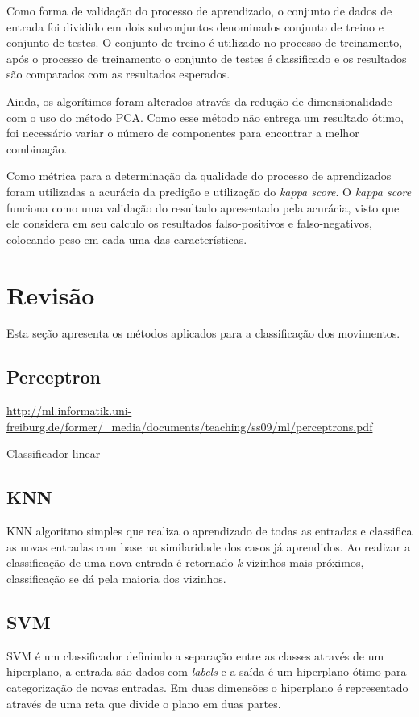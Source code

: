 \documentclass[12pt]{article}
\begin{document}
	Como forma de validação do processo de aprendizado, o conjunto de dados de entrada foi dividido em dois subconjuntos denominados conjunto de treino e conjunto de testes. O conjunto de treino é utilizado no processo de treinamento, após o processo de treinamento o conjunto de testes é classificado e os resultados são comparados com as resultados esperados.
	
	Ainda, os algorítimos foram alterados através da redução de dimensionalidade com o uso do método PCA. Como esse método não entrega um resultado ótimo, foi necessário variar o número de componentes para encontrar a melhor combinação.

	Como métrica para a determinação da qualidade do processo de aprendizados foram utilizadas a acurácia da predição e utilização do \emph{kappa score}. O \textit{kappa score} funciona como uma validação do resultado apresentado pela acurácia, visto que ele considera em seu calculo os resultados falso-positivos e falso-negativos, colocando peso em cada uma das características. 

\section{Revisão}

	Esta seção apresenta os métodos aplicados para a classificação dos movimentos.

\subsection{Perceptron}

	\url{http://ml.informatik.uni-freiburg.de/former/_media/documents/teaching/ss09/ml/perceptrons.pdf}

	Classificador linear 
\subsection{KNN}

	KNN algoritmo simples que realiza o aprendizado de todas as entradas e classifica as novas entradas com base na similaridade dos casos já aprendidos. Ao realizar a classificação de uma nova entrada é retornado \emph{k} vizinhos mais próximos, classificação se dá pela maioria dos vizinhos.
	

\subsection{SVM}

	SVM é um classificador definindo a separação entre as classes através de um hiperplano, a entrada são dados com \emph{labels} e a saída é um hiperplano ótimo para categorização de novas entradas. Em duas dimensões o hiperplano é representado através de uma reta que divide o plano em duas partes.
	
\end{document}
